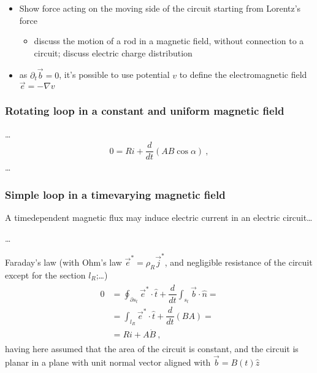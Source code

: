 \documentclass[letterpaper,10pt,english]{jupyterBook}
\begin{document}
\sphinxAtStartPar
{}
\begin{itemize}
\item {} 
\sphinxAtStartPar
Show force acting on the moving side of the circuit starting from Lorentz’s force
\begin{itemize}
\item {} 
\sphinxAtStartPar
discuss the motion of a rod in a magnetic field, without connection to a circuit; discuss electric charge distribution

\end{itemize}

\item {} 
\sphinxAtStartPar
as \(\partial_t \vec{b} = 0\), it’s possible to use potential \(v\) to define the electromagnetic field \(\vec{e} = - \nabla v\)

\end{itemize}


\subsubsection{Rotating loop in a constant and uniform magnetic field}
\label{\detokenize{ch/systems-electromechanic-induction-intro:rotating-loop-in-a-constant-and-uniform-magnetic-field}}
\sphinxAtStartPar
…
\begin{equation*}
\begin{split}0 = R i + \dfrac{d}{dt} \left( A B \cos \alpha \right) \ ,\end{split}
\end{equation*}
\sphinxAtStartPar
…


\subsubsection{Simple loop in a time\sphinxhyphen{}varying magnetic field}
\label{\detokenize{ch/systems-electromechanic-induction-intro:simple-loop-in-a-time-varying-magnetic-field}}
\sphinxAtStartPar
A time\sphinxhyphen{}dependent magnetic flux may induce electric current in an electric circuit…

\sphinxAtStartPar
…

\sphinxAtStartPar
Faraday’s law (with Ohm’s law \(\vec{e}^* = \rho_R \vec{j}^*\), and negligible resistance of the circuit except for the section \(l_R\);…)
\begin{equation*}
\begin{split}\begin{aligned}
  0 
  & = \oint_{\partial s_t} \vec{e}^* \cdot \hat{t} + \dfrac{d}{dt} \int_{s_t} \vec{b} \cdot \hat{n} = \\
  & = \int_{l_R} \vec{e}^* \cdot \hat{t} + \dfrac{d}{dt} \left( B A \right) = \\
  & = R i + A \dot{B} \ ,
\end{aligned}\end{split}
\end{equation*}
\sphinxAtStartPar
having here assumed that the area of the circuit is constant, and the circuit is planar in a plane with unit normal vector aligned with \(\vec{b} = B(t) \hat{z}\)
\end{document}
